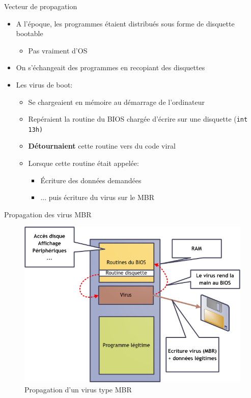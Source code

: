 \documentclass{beamer}
\begin{document}
\begin{frame}{Vecteur de propagation}
\begin{itemize}
\item A l'époque, les programmes étaient distribués sous forme de disquette bootable
\begin{itemize}
\item Pas vraiment d'OS
\end{itemize}
\item On s'échangeait des programmes en recopiant des disquettes
\item Les virus de boot:
\begin{itemize}
\item Se chargeaient en mémoire au démarrage de l'ordinateur
\item Repéraient la routine du BIOS chargée d'écrire sur une disquette (\texttt{int 13h)}
\item \textbf{Détournaient} cette routine vers du code viral
\item Lorsque cette routine était appelée:
\begin{itemize}
\item Écriture des données demandées
\item ... puis écriture du virus sur le MBR
\end{itemize}
\end{itemize}
\end{itemize}
\end{frame}



\begin{frame}{Propagation des virus MBR}
\begin{figure}[!ht]
\includegraphics[scale=0.3]{mbr.png}
\center
\caption{Propagation d'un virus type MBR}
\end{figure}

\end{frame}
\end{document}

